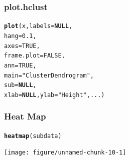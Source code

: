 \documentclass[UTF8]{beamer}\usepackage[]{graphicx}\usepackage[]{color}
\makeatletter
\newcommand{\hlnum}[1]{\textcolor[rgb]{0.686,0.059,0.569}{#1}}%
\newcommand{\hlstr}[1]{\textcolor[rgb]{0.192,0.494,0.8}{#1}}%
\newcommand{\hlstd}[1]{\textcolor[rgb]{0.345,0.345,0.345}{#1}}%
\newcommand{\hlkwa}[1]{\textcolor[rgb]{0.161,0.373,0.58}{\textbf{#1}}}%
\newcommand{\hlkwc}[1]{\textcolor[rgb]{0.333,0.667,0.333}{#1}}%
\newcommand{\hlkwd}[1]{\textcolor[rgb]{0.737,0.353,0.396}{\textbf{#1}}}%
\newenvironment{kframe}{%
 \def\at@end@of@kframe{}%
 \ifinner\ifhmode%
  \def\at@end@of@kframe{\end{minipage}}%
  \begin{minipage}{\columnwidth}%
 \fi\fi%
 \def\FrameCommand##1{\hskip\@totalleftmargin \hskip-\fboxsep
 \colorbox{shadecolor}{##1}\hskip-\fboxsep
     \hskip-\linewidth \hskip-\@totalleftmargin \hskip\columnwidth}%
 \MakeFramed {\advance\hsize-\width
   \@totalleftmargin\z@ \linewidth\hsize
   \@setminipage}}%
 {\par\unskip\endMakeFramed%
 \at@end@of@kframe}
\newenvironment{knitrout}{}{} %
\makeatother
\begin{document}
\begin{frame}[fragile]
  \frametitle{plot.hclust}
\begin{knitrout}
\color{fgcolor}\begin{kframe}
\begin{alltt}
 \hlkwd{plot}\hlstd{(x,} \hlkwc{labels} \hlstd{=} \hlkwa{NULL}\hlstd{,}
 \hlkwc{hang} \hlstd{=} \hlnum{0.1}\hlstd{,}
 \hlkwc{axes} \hlstd{=} \hlnum{TRUE}\hlstd{,}
 \hlkwc{frame.plot} \hlstd{=} \hlnum{FALSE}\hlstd{,}
 \hlkwc{ann} \hlstd{=} \hlnum{TRUE}\hlstd{,}
 \hlkwc{main} \hlstd{=} \hlstr{"Cluster Dendrogram"}\hlstd{,}
 \hlkwc{sub} \hlstd{=} \hlkwa{NULL}\hlstd{,}
 \hlkwc{xlab} \hlstd{=} \hlkwa{NULL}\hlstd{,} \hlkwc{ylab} \hlstd{=} \hlstr{"Height"}\hlstd{, ...)}
\end{alltt}
\end{kframe}
\end{knitrout}
\end{frame}

\begin{frame}[fragile]
  \frametitle{Heat Map}

\begin{knitrout}
\color{fgcolor}\begin{kframe}
\begin{alltt}
 \hlkwd{heatmap}\hlstd{(subdata)}
\end{alltt}
\end{kframe}

{\centering \texttt{[image: figure/unnamed-chunk-10-1]} 

}



\end{knitrout}
\end{frame}
\end{document}
